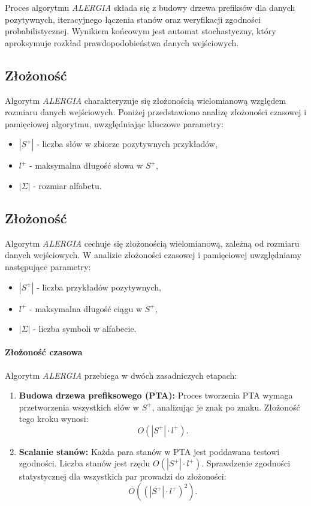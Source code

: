 Proces algorytmu \textit{ALERGIA} składa się z budowy drzewa prefiksów dla danych pozytywnych, iteracyjnego łączenia stanów oraz weryfikacji zgodności probabilistycznej. Wynikiem końcowym jest automat stochastyczny, który aproksymuje rozkład prawdopodobieństwa danych wejściowych.

\subsection{Złożoność}  
Algorytm \textit{ALERGIA} charakteryzuje się złożonością wielomianową względem rozmiaru danych wejściowych. Poniżej przedstawiono analizę złożoności czasowej i pamięciowej algorytmu, uwzględniając kluczowe parametry:  
\begin{itemize}  
    \item \(|S^+|\) - liczba słów w zbiorze pozytywnych przykładów,  
    \item \( l^+ \) - maksymalna długość słowa w \( S^+ \),  
    \item \(|\Sigma|\) - rozmiar alfabetu.  
\end{itemize}  

\subsection{Złożoność}  
Algorytm \textit{ALERGIA} cechuje się złożonością wielomianową, zależną od rozmiaru danych wejściowych. W analizie złożoności czasowej i pamięciowej uwzględniamy następujące parametry:  
\begin{itemize}  
    \item \(|S^+|\) - liczba przykładów pozytywnych,  
    \item \( l^+ \) - maksymalna długość ciągu w \( S^+ \),  
    \item \(|\Sigma|\) - liczba symboli w alfabecie.  
\end{itemize}  

\paragraph*{Złożoność czasowa}  
Algorytm \textit{ALERGIA} przebiega w dwóch zasadniczych etapach:  
\begin{enumerate}  
    \item \textbf{Budowa drzewa prefiksowego (PTA):}  
    Proces tworzenia PTA wymaga przetworzenia wszystkich słów w \( S^+ \), analizując je znak po znaku. Złożoność tego kroku wynosi:  
    \[
    O(|S^+| \cdot l^+).
    \]  

    \item \textbf{Scalanie stanów:}  
    Każda para stanów w PTA jest poddawana testowi zgodności. Liczba stanów jest rzędu \( O(|S^+| \cdot l^+) \). Sprawdzenie zgodności statystycznej dla wszystkich par prowadzi do złożoności:  
    \[
    O((|S^+| \cdot l^+)^2).
    \]  
\end{enumerate}  

